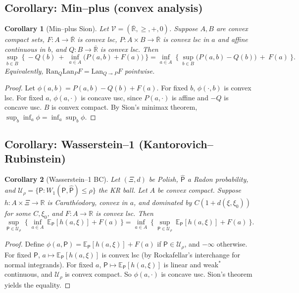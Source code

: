 \documentclass[11pt]{article}
\numberwithin{equation}{section}
\theoremstyle{upright}
\newtheorem{corollary}{Corollary}
\newcommand{\V}{\mathcal{V}}
\newcommand{\Lan}{\mathrm{Lan}}
\newcommand{\Ran}{\mathrm{Ran}}
\newcommand{\resid}{\multimap}
\begin{document}
\subsection{Corollary: Min--plus (convex analysis)}

\begin{corollary}[Min--plus Sion]\label{cor:minplus-BC}
Let $\V=(\overline{\mathbb R},\ge,+,0)$. Suppose
$A,B$ are convex compact sets,
$F:A\to\overline{\mathbb R}$ is convex lsc,
$P:A\times B\to\overline{\mathbb R}$ is convex lsc in $a$ and affine continuous in $b$,
and $Q:B\to\overline{\mathbb R}$ is convex lsc.
Then
\[
\sup_{b\in B}\ \Big\{\ -Q(b)\ +\ \inf_{a\in A}\big(P(a,b)+F(a)\big)\ \Big\}
=\inf_{a\in A}\ \Big\{\ \sup_{b\in B}\big(P(a,b)-Q(b)\big)\ +\ F(a)\ \Big\}.
\]
Equivalently, $\Ran_Q\Lan_P F=\Lan_{Q\resid P}F$ pointwise.
\end{corollary}

\begin{proof}
Let $\phi(a,b)=P(a,b)-Q(b)+F(a)$.  
For fixed $b$, $\phi(\cdot,b)$ is convex lsc.  
For fixed $a$, $\phi(a,\cdot)$ is concave usc, since $P(a,\cdot)$ is affine and $-Q$ is concave usc.  
$B$ is convex compact. By Sion’s minimax theorem, $\sup_b\inf_a \phi=\inf_a\sup_b\phi$.
\end{proof}

\subsection{Corollary: Wasserstein--1 (Kantorovich--Rubinstein)}

\begin{corollary}[Wasserstein--1 BC]\label{cor:W1-BC}
Let $(\Xi,d)$ be Polish, $\widehat{\mathsf P}$ a Radon probability, and
$\mathcal U_\rho=\{\mathsf P: W_1(\mathsf P,\widehat{\mathsf P})\le\rho\}$ the KR ball.
Let $A$ be convex compact. Suppose $h:A\times\Xi\to\mathbb R$ is Carath\'eodory,
convex in $a$, and dominated by $C(1+d(\xi,\xi_0))$ for some $C,\xi_0$,
and $F:A\to\mathbb R$ is convex lsc.
Then
\[
\sup_{\mathsf P\in\mathcal U_\rho}\ \Big\{\ \inf_{a\in A}\ \mathbb E_{\mathsf P}[h(a,\xi)]+F(a)\ \Big\}
=\inf_{a\in A}\ \Big\{\ \sup_{\mathsf P\in\mathcal U_\rho}\ \mathbb E_{\mathsf P}[h(a,\xi)]+F(a)\ \Big\}.
\]
\end{corollary}

\begin{proof}
Define $\phi(a,\mathsf P)=\mathbb E_{\mathsf P}[h(a,\xi)]+F(a)$ if $\mathsf P\in\mathcal U_\rho$, and $-\infty$ otherwise.  
For fixed $\mathsf P$, $a\mapsto \mathbb E_{\mathsf P}[h(a,\xi)]$ is convex lsc (by Rockafellar’s interchange for normal integrands).  
For fixed $a$, $\mathsf P\mapsto \mathbb E_{\mathsf P}[h(a,\xi)]$ is linear and weak$^\ast$ continuous, and $\mathcal U_\rho$ is convex compact.  
So $\phi(a,\cdot)$ is concave usc.  
Sion’s theorem yields the equality.
\end{proof}
\end{document}
